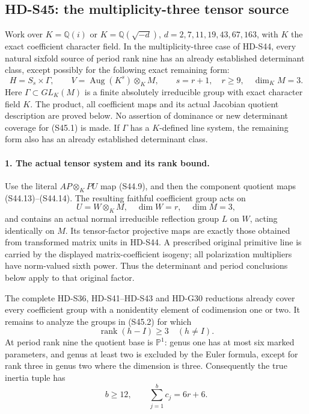 \subsection{HD-S45: the multiplicity-three tensor source}
\label{sec:multiplicity-three-tensor}

Work over \(K=\mathbb Q(i)\) or
\(K=\mathbb Q(\sqrt{-d})\), \(d=2,7,11,19,43,67,163\),
with \(K\) the exact coefficient character field. In the
multiplicity-three case of HD-S44, every natural sixfold
source of period rank nine has an already established
determinant class, except possibly for the following exact
remaining form:
\[
 H=S_s\times\Gamma,\qquad
 V=\operatorname{Aug}(K^s)\otimes_K M,\qquad
 s=r+1,\quad r\ge9,\quad \dim_KM=3.                         \tag{S45.1}
\]
Here \(\Gamma\subset GL_K(M)\) is a finite absolutely
irreducible group with exact character field \(K\).
The product, all coefficient maps and its actual Jacobian
quotient description are proved below. No assertion of
dominance or new determinant coverage for (S45.1) is made.
If \(\Gamma\) has a \(K\)-defined line system, the remaining
form also has an already established determinant class.

\paragraph{1. The actual tensor system and its rank bound.}
Use the literal \(AP\otimes_K PU\) map (S44.9), and
then the component quotient maps (S44.13)--(S44.14).
The resulting faithful coefficient group acts on
\[
                   U=W\otimes_K M,\quad
                   \dim W=r,\quad \dim M=3,                 \tag{S45.2}
\]
and contains an actual normal irreducible reflection group
\(L\) on \(W\), acting identically on \(M\).
Its tensor-factor projective maps are exactly those obtained
from transformed matrix units in HD-S44. A prescribed original
primitive line is carried by the displayed matrix-coefficient
isogeny; all polarization multipliers have norm-valued sixth
power. Thus the determinant and period conclusions below
apply to that original factor.

The complete HD-S36, HD-S41--HD-S43 and HD-G30 reductions
already cover every coefficient group with a nonidentity
element of codimension one or two. It remains to analyze
the groups in (S45.2) for which
\[
                    \operatorname{rank}(h-I)\ge3
                         \quad(h\ne I).                    \tag{S45.3}
\]
At period rank nine the quotient base is \(\mathbb P^1\):
genus one has at most six marked parameters, and genus at
least two is excluded by the Euler formula, except for
rank three in genus two where the dimension is three.
Consequently the true inertia tuple has
\[
             b\ge12,\qquad \sum_{j=1}^b c_j=6r+6.           \tag{S45.4}
\]

